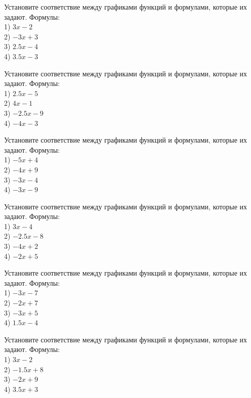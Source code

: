 \documentclass[4apaper]{article}
\begin{document}
\begin{taskBN}{67}
Установите соответствие между графиками функций и формулами, которые их задают. Формулы: \\1) $3x-2$\\2) $-3x+3$\\3) $2.5x-4$\\4) $3.5x-3$
\end{taskBN}

\begin{taskBN}{68}
Установите соответствие между графиками функций и формулами, которые их задают. Формулы: \\1) $2.5x-5$\\2) $4x-1$\\3) $-2.5x-9$\\4) $-4x-3$
\end{taskBN}

\begin{taskBN}{69}
Установите соответствие между графиками функций и формулами, которые их задают. Формулы: \\1) $-5x+4$\\2) $-4x+9$\\3) $-3x-4$\\4) $-3x-9$
\end{taskBN}

\begin{taskBN}{70}
Установите соответствие между графиками функций и формулами, которые их задают. Формулы: \\1) $3x-4$\\2) $-2.5x-8$\\3) $-4x+2$\\4) $-2x+5$
\end{taskBN}

\begin{taskBN}{71}
Установите соответствие между графиками функций и формулами, которые их задают. Формулы: \\1) $-3x-7$\\2) $-2x+7$\\3) $-3x+5$\\4) $1.5x-4$
\end{taskBN}

\begin{taskBN}{72}
Установите соответствие между графиками функций и формулами, которые их задают. Формулы: \\1) $3x-2$\\2) $-1.5x+8$\\3) $-2x+9$\\4) $3.5x+3$
\end{taskBN}
\end{document}
